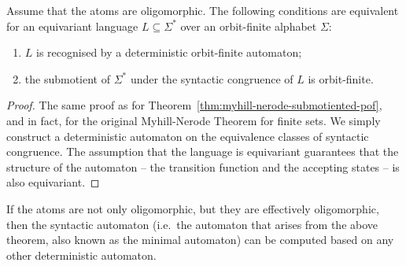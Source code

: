 \begin{theorem}\label{thm:myhill-nerode-oligo}
	Assume that the atoms are oligomorphic. 
    The following conditions are equivalent for an equivariant language $L \subseteq \Sigma^*$ over an orbit-finite alphabet $\Sigma$:
    \begin{enumerate}
        \item\label{item:myhill-nerode-recognised-oligo} $L$ is recognised by a deterministic orbit-finite automaton;
        \item\label{item:myhill-nerode-orbit-finite-oligo} the submotient of $\Sigma^*$ under the syntactic congruence of $L$ is orbit-finite.
    \end{enumerate}
\end{theorem}
\begin{proof}
	The same proof as for Theorem~\ref{thm:myhill-nerode-submotiented-pof}, and in fact, for the original Myhill-Nerode Theorem for finite sets. We simply construct a deterministic automaton on the equivalence classes of syntactic congruence. The assumption that the language is equivariant guarantees that the structure of the automaton -- the transition function and the accepting states -- is also equivariant. 
\end{proof}

If the atoms are not only oligomorphic, but they are effectively oligomorphic, then the syntactic automaton (i.e.~the automaton that arises from the above theorem, also known as the minimal automaton) can be computed based on any other deterministic automaton.

